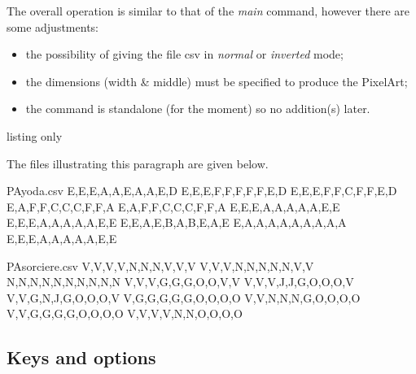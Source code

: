 \documentclass{article}
\begin{document}
The overall operation is similar to that of the \textit{main} command, however there are some adjustments:

\begin{itemize}
	\item the possibility of giving the file \textsf{csv} in \textit{normal} or \textit{inverted} mode;
	\item the dimensions (width \& middle) must be specified to produce the PixelArt;
	\item the command is standalone (for the moment) so no addition(s) later.
\end{itemize}

\begin{PresentationCode}{listing only}
\end{PresentationCode}

The files illustrating this paragraph are given below.

\begin{PresentationCode}{}
\begin{filecontents*}[overwrite]{PAyoda.csv}
E,E,E,A,A,E,A,A,E,D
E,E,E,F,F,F,F,F,E,D
E,E,E,F,F,C,F,F,E,D
E,A,F,F,C,C,C,F,F,A
E,A,F,F,C,C,C,F,F,A
E,E,E,A,A,A,A,A,E,E
E,E,E,A,A,A,A,A,E,E
E,E,A,E,B,A,B,E,A,E
E,A,A,A,A,A,A,A,A,A
E,E,E,A,A,A,A,A,E,E
\end{filecontents*}

\end{PresentationCode}

\begin{PresentationCode}{}
\begin{filecontents*}{PAsorciere.csv}
V,V,V,V,N,N,N,V,V,V
V,V,V,N,N,N,N,N,V,V
N,N,N,N,N,N,N,N,N,N
V,V,V,G,G,G,O,O,V,V
V,V,V,J,J,G,O,O,O,V
V,V,G,N,J,G,O,O,O,V
V,G,G,G,G,G,O,O,O,O
V,V,N,N,N,G,O,O,O,O
V,V,G,G,G,G,O,O,O,O
V,V,V,V,N,N,O,O,O,O
\end{filecontents*}

\end{PresentationCode}

\subsection{Keys and options}
\end{document}
